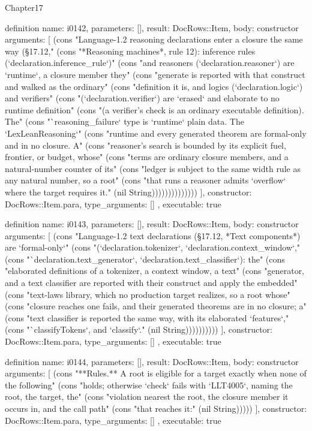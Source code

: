 \begin{lexlean}{Chapter17}
\begin{semanticmodule}
definition{
  name: i0142,
  parameters: [],
  result: DocRows::Item,
  body: constructor{
    arguments: [
      (cons "Language-1.2 reasoning declarations enter a closure the same way (§17.12," (cons "*Reasoning machines*, rule 12): inference rules (`declaration.inference_rule`)" (cons "and reasoners (`declaration.reasoner`) are `runtime`, a closure member they" (cons "generate is reported with that construct and walked as the ordinary" (cons "definition it is, and logics (`declaration.logic`) and verifiers" (cons "(`declaration.verifier`) are `erased` and elaborate to no runtime definition" (cons "(a verifier's check is an ordinary executable definition). The" (cons "`reasoning_failure` type is `runtime` plain data. The `LexLeanReasoning`" (cons "runtime and every generated theorem are formal-only and in no closure. A" (cons "reasoner's search is bounded by its explicit fuel, frontier, or budget, whose" (cons "terms are ordinary closure members, and a natural-number counter of its" (cons "ledger is subject to the same width rule as any natural number, so a root" (cons "that runs a reasoner admits `overflow` where the target requires it." (nil String))))))))))))))
    ],
    constructor: DocRows::Item.para,
    type_arguments: []
  },
  executable: true
}

definition{
  name: i0143,
  parameters: [],
  result: DocRows::Item,
  body: constructor{
    arguments: [
      (cons "Language-1.2 text declarations (§17.12, *Text components*) are `formal-only`" (cons "(`declaration.tokenizer`, `declaration.context_window`," (cons "`declaration.text_generator`, `declaration.text_classifier`): the" (cons "elaborated definitions of a tokenizer, a context window, a text" (cons "generator, and a text classifier are reported with their construct and apply the embedded" (cons "text-laws library, which no production target realizes, so a root whose" (cons "closure reaches one fails, and their generated theorems are in no closure; a" (cons "text classifier is reported the same way, with its elaborated `features`," (cons "`classifyTokens`, and `classify`." (nil String))))))))))
    ],
    constructor: DocRows::Item.para,
    type_arguments: []
  },
  executable: true
}

definition{
  name: i0144,
  parameters: [],
  result: DocRows::Item,
  body: constructor{
    arguments: [
      (cons "**Rules.** A root is eligible for a target exactly when none of the following" (cons "holds; otherwise `check` fails with `LLT4005`, naming the root, the target, the" (cons "violation nearest the root, the closure member it occurs in, and the call path" (cons "that reaches it:" (nil String)))))
    ],
    constructor: DocRows::Item.para,
    type_arguments: []
  },
  executable: true
}


\end{semanticmodule}
\end{lexlean}
